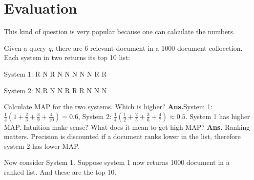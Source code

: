 \documentclass[11pt]{exam}
\newcommand{\ans}{\textbf{Ans.}}
\begin{document}
\section{Evaluation}
This kind of question is very popular because one can calculate the numbers.
\begin{questions}
  \question Given a query $q$, there are $6$ relevant document in a 1000-document 
 colloection. Each system in two returns its top 10 list:


 System 1:  R N R N N  N N N R R
 
 System 2:  N R N N R  R R N N N


\begin{subparts}
  \subpart Calculate MAP for the two systems. Which is higher? 
  \ans System 1: $\frac{1}{4}(1+\frac{2}{3} 
  +\frac{3}{9}+\frac{4}{10})=0.6$, System 2: $\frac{1}{4}(\frac{1}{2}+\frac{2}{5} 
  +\frac{3}{6}+\frac{4}{7})\approx 0.5$. System 1 has higher MAP.
  \subpart Intuition make sense? What does it mean to get high MAP? \ans
  Ranking matters. Precision is discounted if a document ranks lower in the 
  list, therefore system 2 has lower MAP.

Now consider System 1. Suppose system 1 now returns 1000 document in a ranked 
list. And these are the top 10.


\end{subparts}
\end{questions}
\end{document}
